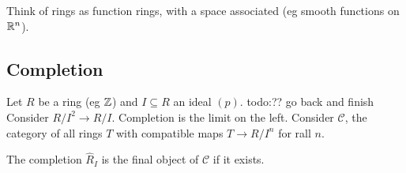 \begin{note}
    Think of rings as function rings, with a space associated (eg smooth functions on $\mathbb{R}^n $).
\end{note}

\subsection{Completion}
Let $R$ be a ring (eg $\mathbb{Z}$) and $I \subseteq R$ an ideal $(p)$. {\color{red}todo:?? go back and finish}  Consider $R /I^2 \to R/I$. Completion is the limit on the left. Consider $\mathcal{C} $, the category of all rings $T$ with compatible maps $T \to  R / I ^n $ for rall $n$.

\begin{definition}[]
    The completion $\hat{R}_I$ is the final object of $\mathcal{C} $ if it exists.
\end{definition}
